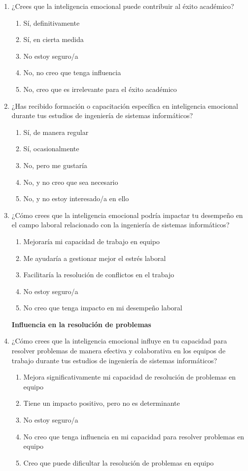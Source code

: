 \documentclass[journal]{IEEEtran}
\begin{document}
\begin{enumerate}
	\item ¿Crees que la inteligencia emocional puede contribuir al éxito académico?
	\begin{enumerate}
		\item Sí, definitivamente
		\item Sí, en cierta medida
		\item No estoy seguro/a
		\item No, no creo que tenga influencia
		\item No, creo que es irrelevante para el éxito académico
	\end{enumerate}
	
	\item ¿Has recibido formación o capacitación específica en inteligencia emocional durante tus estudios de ingeniería de sistemas informáticos?
	\begin{enumerate}
		\item Sí, de manera regular
		\item Sí, ocasionalmente
		\item No, pero me gustaría
		\item No, y no creo que sea necesario
		\item No, y no estoy interesado/a en ello
	\end{enumerate}
	
	\item ¿Cómo crees que la inteligencia emocional podría impactar tu desempeño en el campo laboral relacionado con la ingeniería de sistemas informáticos?
	\begin{enumerate}
		\item Mejoraría mi capacidad de trabajo en equipo
		\item Me ayudaría a gestionar mejor el estrés laboral
		\item Facilitaría la resolución de conflictos en el trabajo
		\item No estoy seguro/a
		\item No creo que tenga impacto en mi desempeño laboral
	\end{enumerate}
	\begin{center}
	\textbf{Influencia en la resolución de problemas}
	\end{center}
	\item ¿Cómo crees que la inteligencia emocional influye en tu capacidad para resolver problemas de manera efectiva y colaborativa en los equipos de trabajo durante tus estudios de ingeniería de sistemas informáticos?
	\begin{enumerate}
		\item Mejora significativamente mi capacidad de resolución de problemas en equipo
		\item Tiene un impacto positivo, pero no es determinante
		\item No estoy seguro/a
		\item No creo que tenga influencia en mi capacidad para resolver problemas en equipo
		\item Creo que puede dificultar la resolución de problemas en equipo
	\end{enumerate}
	

\end{enumerate}
\end{document}
